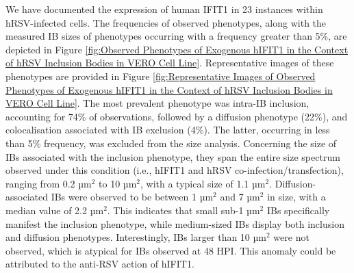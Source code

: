 We have documented the expression of human IFIT1 in 23 instances within hRSV-infected cells. The frequencies of observed phenotypes, along with the measured IB sizes of phenotypes occurring with a frequency greater than 5\%, are depicted in Figure \ref{fig:Observed Phenotypes of Exogenous hIFIT1 in the Context of hRSV Inclusion Bodies in VERO Cell Line}. Representative images of these phenotypes are provided in Figure \ref{fig:Representative Images of Observed Phenotypes of Exogenous hIFIT1 in the Context of hRSV Inclusion Bodies in VERO Cell Line}. The most prevalent phenotype was intra-IB inclusion, accounting for 74\% of observations, followed by a diffusion phenotype (22\%), and colocalisation associated with IB exclusion (4\%). The latter, occurring in less than 5\% frequency, was excluded from the size analysis. Concerning the size of IBs associated with the inclusion phenotype, they span the entire size spectrum observed under this condition (i.e., hIFIT1 and hRSV co-infection/transfection), ranging from 0.2 \(\mbox{µm}^2\) to 10 \(\mbox{µm}^2\), with a typical size of 1.1 \(\mbox{µm}^2\). Diffusion-associated IBs were observed to be between 1 \(\mbox{µm}^2\) and 7 \(\mbox{µm}^2\) in size, with a median value of 2.2 \(\mbox{µm}^2\). This indicates that small sub-1 \(\mbox{µm}^2\) IBs specifically manifest the inclusion phenotype, while medium-sized IBs display both inclusion and diffusion phenotypes. Interestingly, IBs larger than 10 \(\mbox{µm}^2\) were not observed, which is atypical for IBs observed at 48 HPI. This anomaly could be attributed to the anti-RSV action of hIFIT1.

